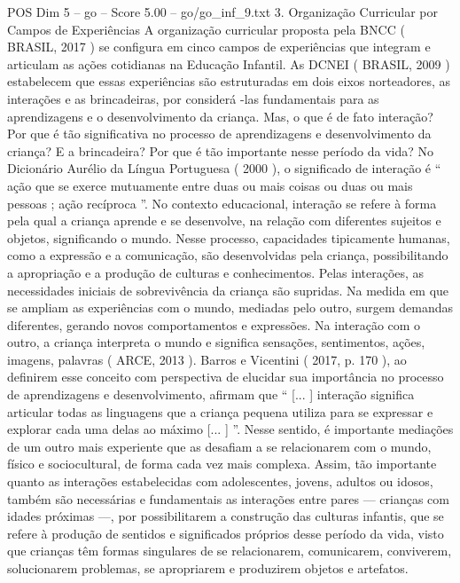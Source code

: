 \begin{textsample}{POS Dim 5 – go – Score 5.00 – go/go\_inf\_9.txt}  \label{ex:f5_pos_020}
3.
Organização Curricular por Campos de Experiências A organização curricular proposta pela BNCC ( BRASIL, 2017 ) se configura em cinco campos de experiências que integram e articulam as ações cotidianas na Educação Infantil.
As DCNEI ( BRASIL, 2009 ) estabelecem que essas experiências são estruturadas em dois eixos norteadores, as interações e as brincadeiras, por considerá -las fundamentais para as aprendizagens e o desenvolvimento da criança.
Mas, o que é de fato interação?
Por que é tão significativa no processo de aprendizagens e desenvolvimento da criança?
E a brincadeira?
Por que é tão importante nesse período da vida?
No Dicionário Aurélio da Língua Portuguesa ( 2000 ), o significado de interação é “ ação que se exerce mutuamente entre duas ou mais coisas ou duas ou mais pessoas ; ação recíproca ”.
No contexto educacional, interação se refere à forma pela qual a criança aprende e se desenvolve, na relação com diferentes sujeitos e objetos, significando o mundo.
Nesse processo, capacidades tipicamente humanas, como a expressão e a comunicação, são desenvolvidas pela criança, possibilitando a apropriação e a produção de culturas e conhecimentos.
Pelas interações, as necessidades iniciais de sobrevivência da criança são supridas.
Na medida em que se ampliam as experiências com o mundo, mediadas pelo outro, surgem demandas diferentes, gerando novos comportamentos e expressões.
Na interação com o outro, a criança interpreta o mundo e significa sensações, sentimentos, ações, imagens, palavras ( ARCE, 2013 ).
Barros e Vicentini ( 2017, p. 170 ), ao definirem esse conceito com perspectiva de elucidar sua importância no processo de aprendizagens e desenvolvimento, afirmam que “ [... ] interação significa articular todas as linguagens que a criança pequena utiliza para se expressar e explorar cada uma delas ao máximo [... ] ”.
Nesse sentido, é importante mediações de um outro mais experiente que as desafiam a se relacionarem com o mundo, físico e sociocultural, de forma cada vez mais complexa.
Assim, tão importante quanto as interações estabelecidas com adolescentes, jovens, adultos ou idosos, também são necessárias e fundamentais as interações entre pares — crianças com idades próximas —, por possibilitarem a construção das culturas infantis, que se refere à produção de sentidos e significados próprios desse período da vida, visto que crianças têm formas singulares de se relacionarem, comunicarem, conviverem, solucionarem problemas, se apropriarem e produzirem objetos e artefatos.

\end{textsample}
